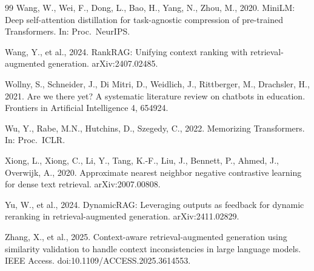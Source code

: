 \documentclass[preprint,12pt]{elsarticle}
\begin{document}
\begin{thebibliography}{99}
Wang, W., Wei, F., Dong, L., Bao, H., Yang, N., Zhou, M., 2020.
MiniLM: Deep self-attention distillation for task-agnostic compression of
pre-trained Transformers. In: Proc.\ NeurIPS.

Wang, Y., et al., 2024.
RankRAG: Unifying context ranking with retrieval-augmented generation.
arXiv:2407.02485.

Wollny, S., Schneider, J., Di Mitri, D., Weidlich, J., Rittberger, M.,
Drachsler, H., 2021.
Are we there yet? A systematic literature review on chatbots in education.
Frontiers in Artificial Intelligence 4, 654924.

Wu, Y., Rabe, M.N., Hutchins, D., Szegedy, C., 2022.
Memorizing Transformers. In: Proc.\ ICLR.

Xiong, L., Xiong, C., Li, Y., Tang, K.-F., Liu, J., Bennett, P., Ahmed, J.,
Overwijk, A., 2020.
Approximate nearest neighbor negative contrastive learning for dense text
retrieval. arXiv:2007.00808.

Yu, W., et al., 2024.
DynamicRAG: Leveraging outputs as feedback for dynamic reranking in
retrieval-augmented generation. arXiv:2411.02829.

Zhang, X., et al., 2025.
Context-aware retrieval-augmented generation using similarity validation
to handle context inconsistencies in large language models.
IEEE Access. doi:10.1109/ACCESS.2025.3614553.

\end{thebibliography}
\end{document}
